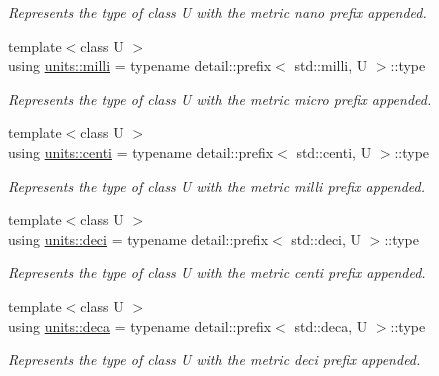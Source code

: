 \begin{DoxyCompactItemize}
\begin{DoxyCompactList}\small\item\em Represents the type of {\ttfamily class U} with the metric \textquotesingle{}nano\textquotesingle{} prefix appended. \end{DoxyCompactList}\item 
{\footnotesize template$<$class U $>$ }\\using \hyperlink{group___unit_manipulators_gaec9d1c320e180eb59f3cb3094d8079dd}{units\+::milli} = typename detail\+::prefix$<$ std\+::milli, U $>$\+::type
\begin{DoxyCompactList}\small\item\em Represents the type of {\ttfamily class U} with the metric \textquotesingle{}micro\textquotesingle{} prefix appended. \end{DoxyCompactList}\item 
{\footnotesize template$<$class U $>$ }\\using \hyperlink{group___unit_manipulators_ga33baefb1c4e794428d7ef77467a8b13e}{units\+::centi} = typename detail\+::prefix$<$ std\+::centi, U $>$\+::type
\begin{DoxyCompactList}\small\item\em Represents the type of {\ttfamily class U} with the metric \textquotesingle{}milli\textquotesingle{} prefix appended. \end{DoxyCompactList}\item 
{\footnotesize template$<$class U $>$ }\\using \hyperlink{group___unit_manipulators_ga21c21d358600828a0a49380d9df693b9}{units\+::deci} = typename detail\+::prefix$<$ std\+::deci, U $>$\+::type
\begin{DoxyCompactList}\small\item\em Represents the type of {\ttfamily class U} with the metric \textquotesingle{}centi\textquotesingle{} prefix appended. \end{DoxyCompactList}\item 
{\footnotesize template$<$class U $>$ }\\using \hyperlink{group___unit_manipulators_ga610922a1098c1f783d7c6972bbfe59f8}{units\+::deca} = typename detail\+::prefix$<$ std\+::deca, U $>$\+::type
\begin{DoxyCompactList}\small\item\em Represents the type of {\ttfamily class U} with the metric \textquotesingle{}deci\textquotesingle{} prefix appended. \end{DoxyCompactList}\item 

\end{DoxyCompactItemize}
